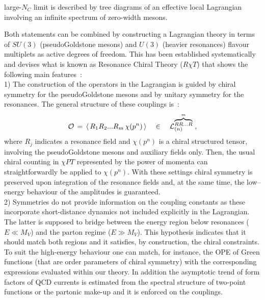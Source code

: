 \documentclass{appolb}
\begin{document}
large-$N_C$ limit
is described by tree diagrams of an effective local Lagrangian involving an infinite spectrum of zero-width mesons.
\vspace*{0.2cm} 
\par
Both statements can be combined by constructing a Lagrangian theory in terms of $SU(3)$ (pseudoGoldstone mesons) 
and $U(3)$ (heavier resonances) flavour multiplets as active degrees of freedom. This has been established
\cite{Ecker:1988te,Ecker:1989yg,Cirigliano:2006hb} systematically and devises what is known as Resonance Chiral
Theory ($R \chi T$) that shows the following main features~: \vspace*{0.2cm} \\
1) The construction of the operators in the Lagrangian is guided by chiral symmetry for the pseudoGoldstone
mesons and by unitary symmetry for the resonances. The general structure of these couplings is~:
\begin{equation} \label{eq:structure}
{\cal O} \, = \, \langle \, R_1 R_2 ...R_m \, \chi(p^n)  \, \rangle \, \; \; \; \in \; \; \; \, 
{\cal L}_{(n)}^{\overbrace{\scriptstyle RR...R}^{m}} \; ,
\end{equation}
where  $R_j$ indicates a resonance field and $\chi (p^n)$ is a chiral structured tensor, involving the pseudoGoldstone
mesons and auxiliary fields only. Then, the usual chiral counting in $\chi PT$ \cite{Weinberg:1978kz} represented by the 
power of momenta can straightforwardly be applied to $\chi (p^n)$. With these settings chiral symmetry is preserved
upon integration of the resonance fields and, at the same time, the low--energy behaviour of the amplitudes is 
guaranteed.  
\vspace*{0.1cm} \\
2) Symmetries do not provide information on the coupling constants as these incorporate short-distance
dynamics not included explicitly in the Lagrangian. The latter 
is supposed to bridge between the energy region below resonances ($E \ll M_V$) and the parton
regime ($E \gg M_V$). This hypothesis indicates that it should match both regions and it satisfies,
by construction, the chiral constraints. To suit the high-energy behaviour one can match, for instance,
the OPE of Green functions (that are order parameters of chiral symmetry) with the corresponding expressions evaluated
within our theory. In addition the asymptotic trend of form factors of QCD currents is estimated  from the 
spectral structure of two-point functions or the partonic make-up and it is enforced on the couplings. 
\end{document}
